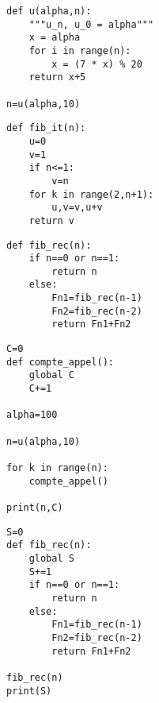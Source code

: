 
\begin{lstlisting}
def u(alpha,n):
    """u_n, u_0 = alpha"""
    x = alpha
    for i in range(n):
        x = (7 * x) % 20
    return x+5

n=u(alpha,10)
\end{lstlisting}






\begin{lstlisting}
def fib_it(n):
    u=0
    v=1
    if n<=1:
        v=n
    for k in range(2,n+1):
        u,v=v,u+v
    return v

\end{lstlisting}



\begin{lstlisting}
def fib_rec(n):
    if n==0 or n==1:
        return n
    else:
        Fn1=fib_rec(n-1)
        Fn2=fib_rec(n-2)
        return Fn1+Fn2

\end{lstlisting}




\begin{lstlisting}
C=0
def compte_appel():
    global C
    C+=1

alpha=100

n=u(alpha,10)

for k in range(n):
    compte_appel()

print(n,C)

\end{lstlisting}




\begin{lstlisting}
S=0
def fib_rec(n):
    global S
    S+=1
    if n==0 or n==1:
        return n
    else:
        Fn1=fib_rec(n-1)
        Fn2=fib_rec(n-2)
        return Fn1+Fn2
        
fib_rec(n)
print(S)
\end{lstlisting}


